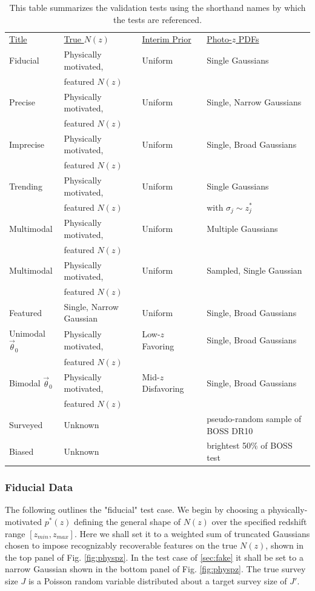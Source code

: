\documentclass[preprint]{aastex}
\newcommand{\textul}{\underline}
\begin{document}
\begin{table}
\begin{tabular}{llll}
\textul{Title} & \textul{True $N(z)$} & \textul{Interim Prior} & 
\textul{Photo-$z$ PDFs}\\
Fiducial & Physically motivated, & Uniform & Single Gaussians\\
& featured $N(z)$ &&\\
Precise & Physically motivated, & Uniform & Single, Narrow Gaussians\\
& featured $N(z)$ &&\\
Imprecise & Physically motivated, & Uniform & Single, Broad Gaussians\\
& featured $N(z)$ &&\\
Trending & Physically motivated, & Uniform & Single Gaussians\\
& featured $N(z)$ && with $\sigma_{j}\sim z^{*}_{j}$\\
Multimodal & Physically motivated, & Uniform & Multiple Gaussians\\
& featured $N(z)$ &&\\
Multimodal & Physically motivated, & Uniform & Sampled, Single Gaussian\\
& featured $N(z)$ &&\\
Featured & Single, Narrow Gaussian & Uniform & Single, Broad Gaussians\\
Unimodal $\vec{\theta}_{0}$ & Physically motivated, & Low-$z$ Favoring & 
Single, Broad Gaussians\\
& featured $N(z)$ &&\\
Bimodal $\vec{\theta}_{0}$& Physically motivated, & Mid-$z$ Disfavoring & 
Single, Broad Gaussians\\
& featured $N(z)$ &&\\
Surveyed & Unknown & \citet{Sheldon2012} & pseudo-random sample of BOSS DR10\\
Biased & Unknown & \citet{Sheldon2012} & brightest 50\% of BOSS test
\end{tabular}
\caption{This table summarizes the validation tests using the shorthand names 
by which the tests are referenced.}
\label{tab:key}
\end{table}

\subsubsection{Fiducial Data}
\label{sec:mock}

The following outlines the "fiducial" test case.  We begin by choosing a 
physically-motivated $p^{*}(z)$ defining the general shape of $N(z)$ over the 
specified redshift range $[z_{min},z_{max}]$.  Here we shall set it to a 
weighted sum of truncated Gaussians chosen to impose recognizably recoverable 
features on the true $N(z)$, shown in the top panel of Fig. \ref{fig:physpz}.  
In the test case of \ref{sec:fake} it shall be set to a narrow Gaussian shown 
in the bottom panel of Fig. \ref{fig:physpz}.  The true survey size $J$ is a 
Poisson random variable distributed about a target survey size of $J'$.
\end{document}
